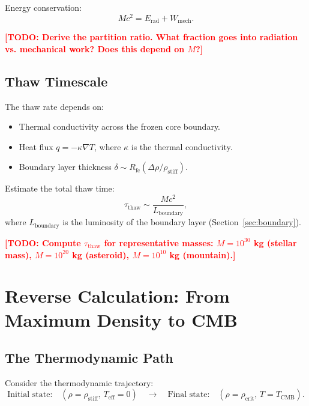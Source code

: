 \documentclass[11pt,a4paper]{article}
\newcommand{\rhocrit}{\ensuremath{\rho_{\mathrm{crit}}}}
\newcommand{\rhostiff}{\ensuremath{\rho_{\mathrm{stiff}}}}
\newcommand{\Teff}{\ensuremath{T_{\mathrm{eff}}}}
\newcommand{\TCMB}{\ensuremath{T_{\mathrm{CMB}}}}
\newcommand{\Rfc}{\ensuremath{R_{\mathrm{fc}}}}
\newcommand{\TODO}[1]{\textcolor{red}{\textbf{[TODO: #1]}}}
\theoremstyle{definition}
\theoremstyle{remark}
\begin{document}
Energy conservation:
\begin{equation}
Mc^2 = E_{\mathrm{rad}} + W_{\mathrm{mech}}.
\label{eq:energy_partition}
\end{equation}

\TODO{Derive the partition ratio. What fraction goes into radiation vs. mechanical work? Does this depend on $M$?}

\subsection{Thaw Timescale}
\label{sec:thaw_timescale}

The thaw rate depends on:
\begin{itemize}[leftmargin=*, itemsep=0.3em]
\item Thermal conductivity across the frozen core boundary.
\item Heat flux $q = -\kappa \nabla T$, where $\kappa$ is the thermal conductivity.
\item Boundary layer thickness $\delta \sim \Rfc (\Delta \rho/\rhostiff)$.
\end{itemize}

Estimate the total thaw time:
\begin{equation}
\tau_{\mathrm{thaw}} \sim \frac{Mc^2}{L_{\mathrm{boundary}}},
\label{eq:tau_thaw}
\end{equation}
where $L_{\mathrm{boundary}}$ is the luminosity of the boundary layer (Section~\ref{sec:boundary}).

\TODO{Compute $\tau_{\mathrm{thaw}}$ for representative masses: $M = 10^{30}$ kg (stellar mass), $M = 10^{20}$ kg (asteroid), $M = 10^{10}$ kg (mountain).}

\section{Reverse Calculation: From Maximum Density to CMB}
\label{sec:reverse_calc}

\subsection{The Thermodynamic Path}
\label{sec:thermo_path}

Consider the thermodynamic trajectory:
\begin{equation}
\text{Initial state:} \quad (\rho = \rhostiff, \, \Teff = 0) \quad \to \quad \text{Final state:} \quad (\rho = \rhocrit, \, T = \TCMB).
\end{equation}
\end{document}
